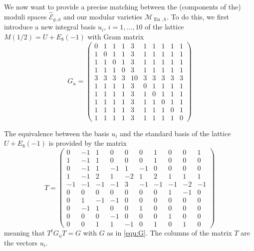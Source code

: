 \documentclass[a4paper,11pt]{article}
\newcommand{\cE}{\mathcal E}
\newcommand{\cM}{\mathcal M}
\newcommand{\En}{\mathop{\mathrm {En}}\nolimits}
\begin{document}
We now want to provide a precise matching between the (components of the) moduli spaces $\widehat{\cE}_{g,\phi}$ and our modular varieties $\cM_{\En,h}$.
To do this, we first introduce a new integral
basis $u_i$,  $i= 1, \ldots ,10$ of the lattice $M(1/2)=U + E_8(-1)$ with Gram matrix
\begin{equation}\label{basisui}
G_u=
\left(\begin{array}{cccccccccc}
0 &   1 &   1 &   1 &   3 &   1 &   1 &   1 &   1 &   1\\
 1 &   0 &   1 &   1 &   3 &   1 &   1 &   1 &   1 &   1 \\
 1 &   1 &   0 &   1 &   3 &   1 &   1 &   1 &   1 &   1 \\
  1 &   1 &   1 &   0 &   3 &   1 &   1 &   1 &   1 &   1\\
  3 &   3 &   3 &   3 &  10 &   3 &   3 &   3 &   3 &   3\\
  1 &  1 &   1 &   1 &   3 &   0 &   1 &   1 &   1 &   1\\
  1 &   1 &   1 &   1 &   3 &   1 &   0 &   1 &   1 &   1 \\
  1 &   1 &   1 &   1 &   3 &   1 &   1&   0 &   1 &   1 \\
  1 &   1 &   1 &   1&   3 &   1 &   1 &   1 &   0 &   1 \\
  1 &   1 &   1 &   1 &   3 &   1 &  1 &   1 &   1 &   0
\end{array}\right)
\end{equation}

The equivalence between the basis $u_i$ and the standard basis of the lattice $U + E_8(-1)$ is provided by the matrix
\begin{equation}\label{test}
T=
\left(\begin{array}{cccccccccc}
  0 &  -1 &   1 &   0 &   0 &   0 &   1&   0 &  0 &   1 \\
  1 & -1 &   1 &   0 &   0 &   0 &   1 &   0 &   0 &   0 \\
  0 &  -1 &   1 & -1 &   1 &  -1 &   0 &   0 &   0 &   0 \\
  1 &  -1 &   2 &   1&  -2 &   1 &   2 &   1 &   1 &   1 \\
  -1 &  -1 &  -1 &  -1 &   3 &  -1 &  -1 &  -1 &  -2 &  -1 \\
   0 &   0 &   0 &   0 &   0 &   0 &   0 &   1 &  -1 &   0 \\
   0 &   1 &  -1 &  -1 &   0 &   0 &   0 &   0 &   0 &   0 \\
   0 &  -1 &   1 &   0 &   0 &   1 &   0 &   0 &   0 &   0 \\
   0 &   0 &   0 &  -1 &   0 &  0 &   0 &   1&   0 &   0 \\
   0 &   0 &   1 &   1 &  -1 &   0 &   1 &   0 &   1 &   0
\end{array}\right)
\end{equation}
meaning that $T^tG_u T=G$ with $G$ as in \eqref{equ:G}.
The columns of the matrix $T$ are the vectors $u_i$.
\end{document}
